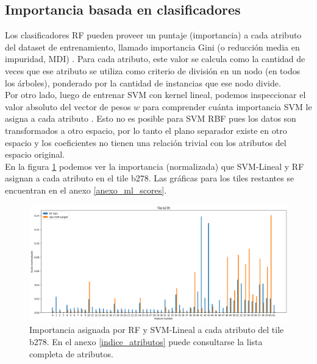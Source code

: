 \subsection{Importancia basada en clasificadores}

Los clasificadores RF pueden proveer un puntaje (importancia) a cada atributo del dataset de entrenamiento, llamado importancia Gini (o reducción media en impuridad, MDI) \cite{statisticallearning}. Para cada atributo, este valor se calcula como la cantidad de veces que ese atributo se utiliza como criterio de división en un nodo (en todos los árboles), ponderado por la cantidad de instancias que ese nodo divide. \\

Por otro lado, luego de entrenar SVM con kernel lineal, podemos inspeccionar el valor absoluto del vector de pesos $w$ para comprender cuánta importancia SVM le asigna a cada atributo \cite{svm_importance}. Esto no es posible para SVM RBF pues los datos son transformados a otro espacio, por lo tanto el plano separador existe en otro espacio y los coeficientes no tienen una relación trivial con los atributos del espacio original. \\

En la figura \ref{fig:ml_importance_b278} podemos ver la importancia (normalizada) que SVM-Lineal y RF asignan a cada atributo en el tile b278. Las gráficas para los tiles restantes se encuentran en el anexo \ref{anexo_ml_scores}. \\

\begin{figure}[h!]
\centering
  \includegraphics[width=1\textwidth]{Kap6/test=b278_ML_variable_importance_scores}
\caption{ Importancia asignada por RF y SVM-Lineal a cada atributo del tile b278. En el anexo \protect\ref{indice_atributos} puede consultarse la lista completa de atributos. }
\label{fig:ml_importance_b278}
\end{figure}

